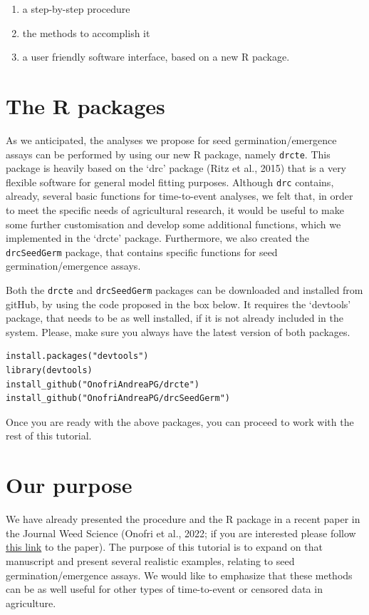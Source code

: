 \documentclass[
]{book}
\providecommand{\tightlist}{%
  \setlength{\itemsep}{0pt}\setlength{\parskip}{0pt}}
\begin{document}
\begin{enumerate}
\def\labelenumi{\arabic{enumi}.}
\tightlist
\item
  a step-by-step procedure
\item
  the methods to accomplish it
\item
  a user friendly software interface, based on a new R package.
\end{enumerate}

\hypertarget{the-r-packages}{%
\section{The R packages}\label{the-r-packages}}

As we anticipated, the analyses we propose for seed germination/emergence assays can be performed by using our new R package, namely \texttt{drcte}. This package is heavily based on the `drc' package (Ritz et al., 2015) that is a very flexible software for general model fitting purposes. Although \texttt{drc} contains, already, several basic functions for time-to-event analyses, we felt that, in order to meet the specific needs of agricultural research, it would be useful to make some further customisation and develop some additional functions, which we implemented in the `drcte' package. Furthermore, we also created the \texttt{drcSeedGerm} package, that contains specific functions for seed germination/emergence assays.

Both the \texttt{drcte} and \texttt{drcSeedGerm} packages can be downloaded and installed from gitHub, by using the code proposed in the box below. It requires the `devtools' package, that needs to be as well installed, if it is not already included in the system. Please, make sure you always have the latest version of both packages.

\begin{verbatim}
install.packages("devtools")
library(devtools)
install_github("OnofriAndreaPG/drcte")
install_github("OnofriAndreaPG/drcSeedGerm")
\end{verbatim}

Once you are ready with the above packages, you can proceed to work with the rest of this tutorial.

\hypertarget{our-purpose}{%
\section{Our purpose}\label{our-purpose}}

We have already presented the procedure and the R package in a recent paper in the Journal Weed Science (Onofri et al., 2022; if you are interested please follow \href{https://doi.org/10.1017/wsc.2022.8}{this link} to the paper). The purpose of this tutorial is to expand on that manuscript and present several realistic examples, relating to seed germination/emergence assays. We would like to emphasize that these methods can be as well useful for other types of time-to-event or censored data in agriculture.
\end{document}
